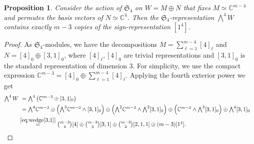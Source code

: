 \documentclass[11pt,reqno]{amsart}
\newtheorem{proposition}[theorem]{Proposition}
\theoremstyle{definition}
\numberwithin{theorem}{section}
\numberwithin{equation}{section}
\begin{document}
\begin{proposition}\label{prop:sign-rep in wedge4}
Consider the action of $\mathfrak{S}_4$ on $W = M \oplus N$ that fixes $M\simeq \mathbb C^{m-4}$ and permutes the basis vectors of $N\simeq \mathbb C^4$. Then the $\mathfrak{S}_4$-representation $\bigwedge^4W$ contains exactly $m-3$ copies of the sign-representation $[1^4]$.
\end{proposition}
\begin{proof}
As $\mathfrak{S}_4$-modules, we have the decompositions $M = \sum_{\ell =1}^{m-4}[4]_\ell$ and $N=[4]_0 \oplus [3,1]_0$, where $[4]_\ell, [4]_0$ are trivial representations and  $[3,1]_0$ is the standard representation of dimension $3$. For simplicity, we use the compact expression $\mathbb C^{m-3} = [4]_0 \oplus \sum_{\ell =1}^{m-4}[4]_\ell$. Applying the fourth exterior power we get
{\small
\begin{align*}  \textstyle{\bigwedge^4W} & \ = {\textstyle \bigwedge^4}\left(\mathbb C^{m-3} \oplus [3,1]_0 \right) \\
& \ =  {\textstyle \bigwedge^4}\mathbb C^{m-3} \oplus \left({\textstyle \bigwedge^3} \mathbb C^{m-3} \wedge [3,1]_0 \right) \oplus \left( {\textstyle \bigwedge^2} \mathbb C^{m-3} \wedge {\textstyle \bigwedge^2}[3,1]_0 \right) \oplus \left( \mathbb C^{m-3} \wedge {\textstyle \bigwedge^3}[3,1]_0 \right) \oplus {\textstyle \bigwedge^4}[3,1]_0  \\
& \stackrel{\eqref{eq:wedge[3,1]}}{=} {\textstyle \binom{m-3}{4}[4] \oplus \binom{m-3}{3}[3,1] \oplus \binom{m-3}{2}[2,1,1] \oplus (m-3)[1^4]} .
\end{align*}
}
\end{proof}
\end{document}
